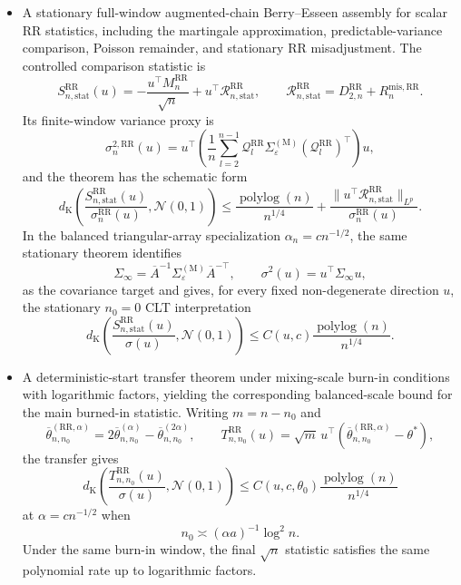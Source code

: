 \begin{itemize}
  \item A stationary full-window augmented-chain Berry--Esseen assembly for
  scalar RR statistics, including the martingale approximation,
  predictable-variance comparison, Poisson remainder, and stationary RR
  misadjustment. The controlled comparison statistic is
  \[
    S_{n,\mathrm{stat}}^{\mathrm{RR}}(u)
      =-\frac{u^\top M_n^{\mathrm{RR}}}{\sqrt{n}}
       +u^\top\mathcal{R}_{n,\mathrm{stat}}^{\mathrm{RR}},
    \qquad
    \mathcal{R}_{n,\mathrm{stat}}^{\mathrm{RR}}
      =D_{2,n}^{\mathrm{RR}}+R_n^{\mathrm{mis,RR}}.
  \]
  Its finite-window variance proxy is
  \[
    \sigma_n^{2,\mathrm{RR}}(u)
      =u^\top\left(
        \frac{1}{n}\sum_{l=2}^{n-1}
          \mathcal{Q}_l^{\mathrm{RR}}
          \Sigma_\varepsilon^{(\mathrm{M})}
          (\mathcal{Q}_l^{\mathrm{RR}})^\top
      \right)u,
  \]
  and the theorem has the schematic form
  \[
    d_{\mathrm K}\!\left(
      \frac{S_{n,\mathrm{stat}}^{\mathrm{RR}}(u)}
           {\sigma_n^{\mathrm{RR}}(u)},
      \mathcal{N}(0,1)
    \right)
      \leq \frac{\operatorname{polylog}(n)}{n^{1/4}}
      +\frac{
        \lVert u^\top\mathcal{R}_{n,\mathrm{stat}}^{\mathrm{RR}}\rVert_{L^p}
      }{\sigma_n^{\mathrm{RR}}(u)}.
  \]
  In the balanced triangular-array specialization $\alpha_n=cn^{-1/2}$,
  the same stationary theorem identifies
  \[
    \Sigma_\infty
      =\overline{A}^{-1}\Sigma_\varepsilon^{(\mathrm{M})}
       \overline{A}^{-\top},
    \qquad
    \sigma^2(u)=u^\top\Sigma_\infty u,
  \]
  as the covariance target and gives, for every fixed non-degenerate direction
  $u$, the stationary $n_0=0$ CLT interpretation
  \[
    d_{\mathrm K}\!\left(
      \frac{S_{n,\mathrm{stat}}^{\mathrm{RR}}(u)}{\sigma(u)},
      \mathcal{N}(0,1)
    \right)
      \leq C(u,c)\frac{\operatorname{polylog}(n)}{n^{1/4}}.
  \]

  \item A deterministic-start transfer theorem under mixing-scale burn-in
  conditions with logarithmic factors, yielding the corresponding
  balanced-scale bound for the main burned-in statistic. Writing $m=n-n_0$
  and
  \[
    \overline{\theta}_{n,n_0}^{(\mathrm{RR},\alpha)}
      =2\overline{\theta}_{n,n_0}^{(\alpha)}
       -\overline{\theta}_{n,n_0}^{(2\alpha)},
    \qquad
    T_{n,n_0}^{\mathrm{RR}}(u)
      =\sqrt{m}\,u^\top\left(
        \overline{\theta}_{n,n_0}^{(\mathrm{RR},\alpha)}-\theta^*
      \right),
  \]
  the transfer gives
  \[
    d_{\mathrm K}\!\left(
      \frac{T_{n,n_0}^{\mathrm{RR}}(u)}{\sigma(u)},
      \mathcal{N}(0,1)
    \right)
      \leq C(u,c,\theta_0)
      \frac{\operatorname{polylog}(n)}{n^{1/4}}
  \]
  at $\alpha=cn^{-1/2}$ when
  \[
    n_0\asymp(\alpha a)^{-1}\log^2 n.
  \]
  Under the same burn-in window, the final $\sqrt{n}$ statistic satisfies the
  same polynomial rate up to logarithmic factors.
\end{itemize}
